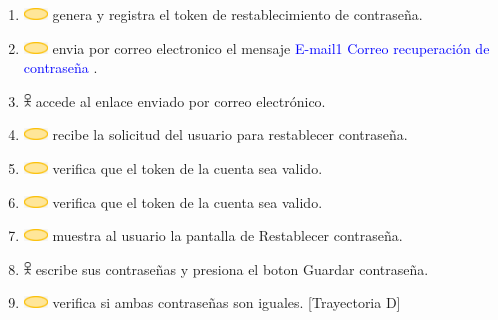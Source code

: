 \begin{enumerate}
    \item \includegraphics[width=0.0500\textwidth]{Figuras/sistema.png} genera y registra el token de restablecimiento de contraseña.
    \item \includegraphics[width=0.0500\textwidth]{Figuras/sistema.png} envia por correo electronico el mensaje \textcolor{blue}{E-mail1 Correo recuperación de contraseña} .
    \item \includegraphics[width=0.0150\textwidth]{Figuras/persona.png} accede al enlace enviado por correo electrónico.
    \item \includegraphics[width=0.0500\textwidth]{Figuras/sistema.png} recibe la solicitud del usuario para restablecer contraseña.
    \item \includegraphics[width=0.0500\textwidth]{Figuras/sistema.png} verifica que el token de la cuenta sea valido.
    \item \includegraphics[width=0.0500\textwidth]{Figuras/sistema.png} verifica que el token de la cuenta sea valido.
    \item \includegraphics[width=0.0500\textwidth]{Figuras/sistema.png} muestra al usuario la pantalla de Restablecer contraseña.
    \item \includegraphics[width=0.0150\textwidth]{Figuras/persona.png} escribe sus contraseñas y presiona el boton Guardar contraseña.
    \item \includegraphics[width=0.0500\textwidth]{Figuras/sistema.png} verifica si ambas contraseñas son iguales. [Trayectoria D]

\end{enumerate}
